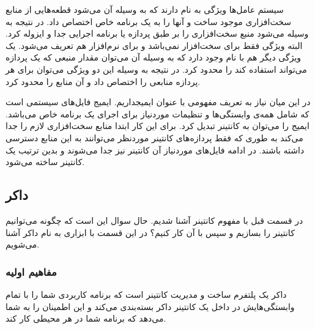 سیستم عامل‌ها ویژگی به نام
دارند که به وسیله آن می‌شود قطعه‌هایی از منابع سخت‌افزاری موجود ساخت و آنها را به یک برنامه خاص اختصاص داد. در نتیجه به وسیله
می‌شود منبع سخت‌افزاری را بر طبق  پردازه یا برنامه اجرایی جدا و ایزوله کرد. البته ویژگی
فقط برای سخت‌افزار نمی‌باشد و برای نرم‌افزار هم تعریف می‌شود. یک ویژگی دیگر هم با نام
وجود دارد که به وسیله آن می‌توان مقدار منبعی که یک پردازه می‌تواند استفاده کند را محدود کرد. در نتیجه به وسیله این دو ویژگی می‌توان برای هر پردازه منابعی را اختصاص داد و آن منابع را محدود کرد. 

در این میان نیاز به تعریف مفهومی با عنوان ایمیجداریم. ایمیج فایل‌های سیستمی است که شامل همه‌ی وابستگی‌ها و تنظیمات موردنیاز برای اجرای یک برنامه خاص می‌باشد. ایمیج را می‌توان به کانتینر تبدیل کرد. برای این کار ابتدا
منابع سخت‌افزاری لازم را جدا می‌کند به طوری که فقط پردازه‌های کانتینر موردنظر می‌توانند به این منابع دسترسی داشته باشند. در ادامه فایل‌های موردنیاز آن کانتینر نیز جدا می‌شوند و بدین ترتیب یک کانتینر ساخته می‌شود.


\subsection{داکر}

در قسمت قبل با مفهوم کانتینر آشنا شدیم. حال سوال این است که چگونه می‌توانیم کانتینر را بسازیم و سپس با آن کار کنیم؟ در این قسمت با ابزاری به نام داکر آشنا می‌شویم.

\subsubsection{مفاهیم اولیه}

داکر یک پلتفرم ساخت و مدیریت کانتینر است که برنامه کاربردی شما را با تمام وابستگی‌هایش در داخل یک کانتینر داکر بسته‌بندی می‌کند و این اطمینان را به شما می‌دهد که برنامه شما در هر محیطی کار کند.


